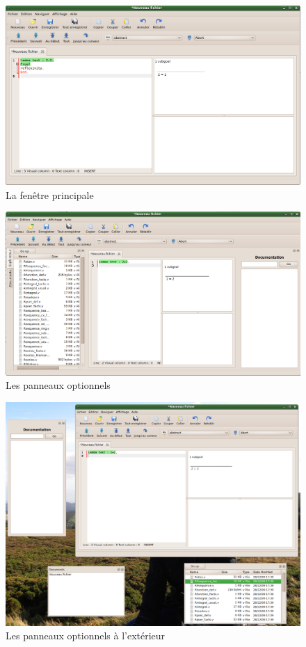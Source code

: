         \begin{figure}[ht]
            \centering
            \includegraphics[scale=0.4]{../images/ide/mainwindow.png}
            \caption{La fenêtre principale}
            \label{fig:mainwindow}
        \end{figure}
        \begin{figure}[ht]
            \centering
            \includegraphics[scale=0.3]{../images/ide/pannels.png}
            \caption{Les panneaux optionnels}
            \label{fig:pannels}
        \end{figure}
        \begin{figure}[ht]
            \centering
            \includegraphics[scale=0.3]{../images/ide/pannelsext.png}
            \caption{Les panneaux optionnels à l'extérieur}
            \label{fig:pannelsext}
        \end{figure}
